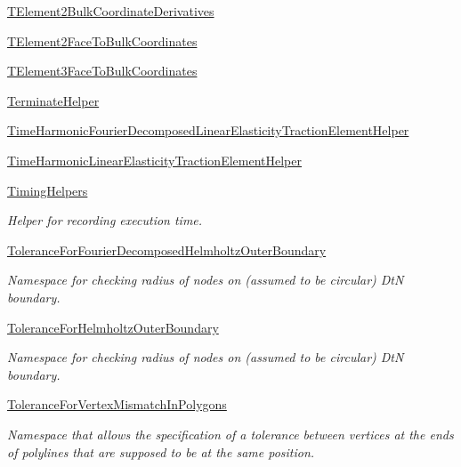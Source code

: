 \begin{DoxyCompactItemize}
\item 
 \hyperlink{namespaceoomph_1_1TElement2BulkCoordinateDerivatives}{T\+Element2\+Bulk\+Coordinate\+Derivatives}
\item 
 \hyperlink{namespaceoomph_1_1TElement2FaceToBulkCoordinates}{T\+Element2\+Face\+To\+Bulk\+Coordinates}
\item 
 \hyperlink{namespaceoomph_1_1TElement3FaceToBulkCoordinates}{T\+Element3\+Face\+To\+Bulk\+Coordinates}
\item 
 \hyperlink{namespaceoomph_1_1TerminateHelper}{Terminate\+Helper}
\item 
 \hyperlink{namespaceoomph_1_1TimeHarmonicFourierDecomposedLinearElasticityTractionElementHelper}{Time\+Harmonic\+Fourier\+Decomposed\+Linear\+Elasticity\+Traction\+Element\+Helper}
\item 
 \hyperlink{namespaceoomph_1_1TimeHarmonicLinearElasticityTractionElementHelper}{Time\+Harmonic\+Linear\+Elasticity\+Traction\+Element\+Helper}
\item 
 \hyperlink{namespaceoomph_1_1TimingHelpers}{Timing\+Helpers}
\begin{DoxyCompactList}\small\item\em Helper for recording execution time. \end{DoxyCompactList}\item 
 \hyperlink{namespaceoomph_1_1ToleranceForFourierDecomposedHelmholtzOuterBoundary}{Tolerance\+For\+Fourier\+Decomposed\+Helmholtz\+Outer\+Boundary}
\begin{DoxyCompactList}\small\item\em Namespace for checking radius of nodes on (assumed to be circular) DtN boundary. \end{DoxyCompactList}\item 
 \hyperlink{namespaceoomph_1_1ToleranceForHelmholtzOuterBoundary}{Tolerance\+For\+Helmholtz\+Outer\+Boundary}
\begin{DoxyCompactList}\small\item\em Namespace for checking radius of nodes on (assumed to be circular) DtN boundary. \end{DoxyCompactList}\item 
 \hyperlink{namespaceoomph_1_1ToleranceForVertexMismatchInPolygons}{Tolerance\+For\+Vertex\+Mismatch\+In\+Polygons}
\begin{DoxyCompactList}\small\item\em Namespace that allows the specification of a tolerance between vertices at the ends of polylines that are supposed to be at the same position. \end{DoxyCompactList}\item 

\end{DoxyCompactItemize}
